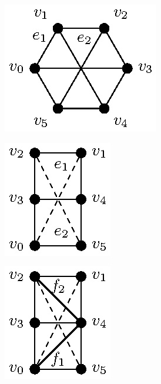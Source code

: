 \ClearMyMinHeight
{}

\begin{figure}\centering
    \begin{subfigure}{.2\linewidth}\centering
        \includegraphics[height=\myMinHeight]{../../img/epsfromtikz/omd_k33_example_new-0}
        \caption{}\label{fig:omd_k33_example:a}
    \end{subfigure}\hfill
    \begin{subfigure}{.15\linewidth}\centering
        \includegraphics[height=\myMinHeight]{../../img/epsfromtikz/omd_k33_example_new-1}
        \caption{}\label{fig:omd_k33_example:b}
    \end{subfigure}
    \begin{subfigure}{.15\linewidth}\centering
        \includegraphics[height=\myMinHeight]{../../img/epsfromtikz/omd_k33_example_new-2}

\end{subfigure}
\end{figure}
